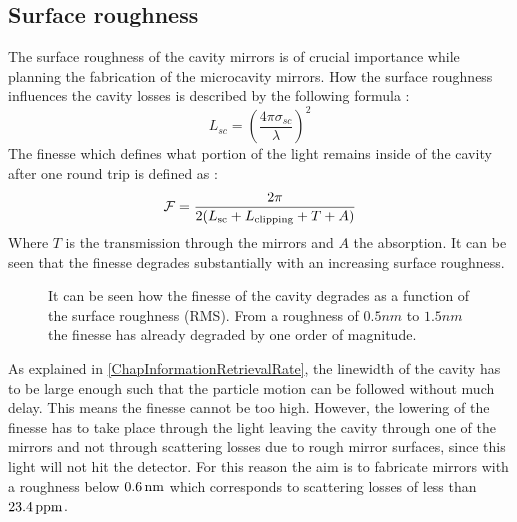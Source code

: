 \subsection{Surface roughness}
The surface roughness of the cavity mirrors is of crucial importance while planning the fabrication of the microcavity mirrors. How the surface roughness influences the cavity losses is described by the following formula \cite{roy2011fabrication}:
\begin{equation}
	L_{\si{sc}}=\left(\frac{4\pi\sigma_{\si{sc}}}{\lambda}\right)^2
\end{equation}
The finesse which defines what portion of the light remains inside of the cavity after one round trip is defined as \cite{roy2011fabrication}:
\begin{equation}
	\mathcal{F}=\frac{2\pi}{2(L_{\si{sc}}+\de{L}{clipping}+T+A)}
\end{equation}
Where $T$ is the transmission through the mirrors and $A$ the absorption. It can be seen that the finesse degrades substantially with an increasing surface roughness.
\begin{figure}[H]
	
	\caption{It can be seen how the finesse of the cavity degrades as a function of the surface roughness (RMS). From a roughness of $0.5\si{nm}$ to $1.5\si{nm}$ the finesse has already degraded by one order of magnitude.}
\end{figure}
As explained in \autoref{ChapInformationRetrievalRate}, the linewidth of the cavity has to be large enough such that the particle motion can be followed without much delay. This means the finesse cannot be too high. However, the lowering of the finesse has to take place through the light leaving the cavity through one of the mirrors and not through scattering losses due to rough mirror surfaces, since this light will not hit the detector. For this reason the aim is to fabricate mirrors with a roughness below $0.6\nm$ which corresponds to scattering losses of less than $23.4\ppm$.

